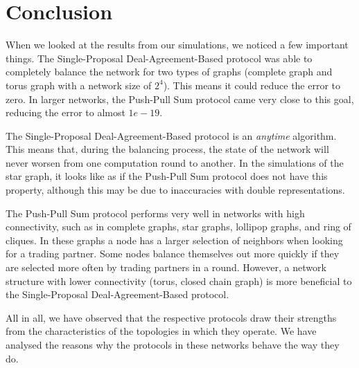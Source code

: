 \chapter{Conclusion}\label{chap:conclusion}
When we looked at the results from our simulations, we noticed a few important things. The Single-Proposal Deal-Agreement-Based protocol was able to completely balance the network for two types of graphs (complete graph and torus graph with a network size of $2^{4}$). This means it could reduce the error to zero. In larger networks, the Push-Pull Sum protocol came very close to this goal, reducing the error to almost $1e-19$.  

The Single-Proposal Deal-Agreement-Based protocol is an \textit{anytime} algorithm. This means that, during the balancing process, the state of the network will never worsen from one computation round to another. In the simulations of the star graph, it looks like as if the Push-Pull Sum protocol does not have this property, although this may be due to inaccuracies with double representations.

The Push-Pull Sum protocol performs very well in networks with high connectivity, such as in complete graphs, star graphs, lollipop graphs, and ring of cliques. In these graphs a node has a larger selection of neighbors when looking for a trading partner. Some nodes balance themselves out more quickly if they are selected more often by trading partners in a round. However, a network structure with lower connectivity (torus, closed chain graph) is more beneficial to the Single-Proposal Deal-Agreement-Based protocol.

All in all, we have observed that the respective protocols draw their strengths from the characteristics of the topologies in which they operate. We have analysed the reasons why the protocols in these networks behave the way they do.